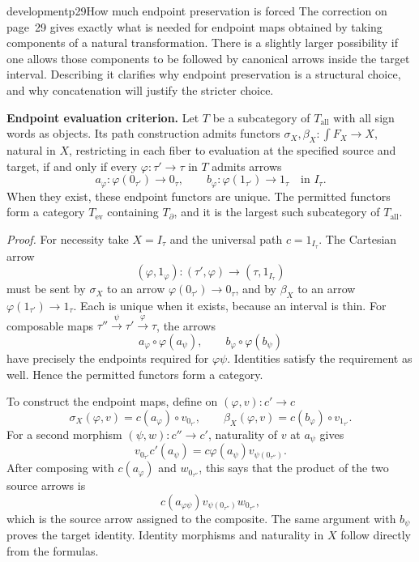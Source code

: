 \begin{dcomment}{development}{p29}{How much endpoint preservation is forced}
The correction on page~29 gives exactly what is needed for endpoint maps obtained by taking components of a natural transformation. There is a slightly larger possibility if one allows those components to be followed by canonical arrows inside the target interval. Describing it clarifies why endpoint preservation is a structural choice, and why concatenation will justify the stricter choice.

\textbf{Endpoint evaluation criterion.}\ours{}
Let $T$ be a subcategory of $T_{\mathrm{all}}$ with all sign words as objects. Its path construction admits functors $\sigma_X,\beta_X:\int F_X\to X$, natural in $X$, restricting in each fiber to evaluation at the specified source and target, if and only if every $\varphi:\tau'\to\tau$ in $T$ admits arrows
\[
 a_\varphi:\varphi(0_{\tau'})\longrightarrow0_\tau,
 \qquad
 b_\varphi:\varphi(1_{\tau'})\longrightarrow1_\tau
 \quad\text{in }I_\tau.
\]
When they exist, these endpoint functors are unique. The permitted functors form a category $T_{\mathrm{ev}}$ containing $T_{\partial}$, and it is the largest such subcategory of $T_{\mathrm{all}}$.

\emph{Proof.} For necessity take $X=I_\tau$ and the universal path $c=1_{I_\tau}$. The Cartesian arrow
\[
 (\varphi,1_\varphi):(\tau',\varphi)\longrightarrow(\tau,1_{I_\tau})
\]
must be sent by $\sigma_X$ to an arrow $\varphi(0_{\tau'})\to0_\tau$, and by $\beta_X$ to an arrow $\varphi(1_{\tau'})\to1_\tau$. Each is unique when it exists, because an interval is thin. For composable maps $\tau''\xrightarrow{\psi}\tau'\xrightarrow{\varphi}\tau$, the arrows
\[
 a_\varphi\circ\varphi(a_\psi),\qquad
 b_\varphi\circ\varphi(b_\psi)
\]
have precisely the endpoints required for $\varphi\psi$. Identities satisfy the requirement as well. Hence the permitted functors form a category.

To construct the endpoint maps, define on $(\varphi,v):c'\to c$
\[
 \sigma_X(\varphi,v)=c(a_\varphi)\circ v_{0_{\tau'}},
 \qquad
 \beta_X(\varphi,v)=c(b_\varphi)\circ v_{1_{\tau'}}.
\]
For a second morphism $(\psi,w):c''\to c'$, naturality of $v$ at $a_\psi$ gives
\[
 v_{0_{\tau'}}c'(a_\psi)
   =c\varphi(a_\psi)v_{\psi(0_{\tau''})}.
\]
After composing with $c(a_\varphi)$ and $w_{0_{\tau''}}$, this says that the product of the two source arrows is
\[
 c(a_{\varphi\psi})
 v_{\psi(0_{\tau''})}w_{0_{\tau''}},
\]
which is the source arrow assigned to the composite. The same argument with $b_\psi$ proves the target identity. Identity morphisms and naturality in $X$ follow directly from the formulas.


\end{dcomment}
